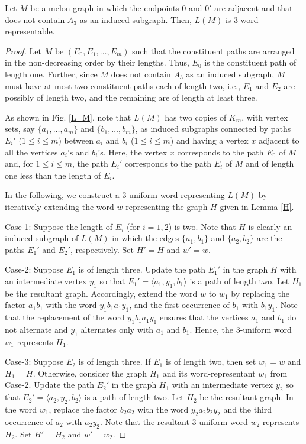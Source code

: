 \documentclass{llncs}
\begin{document}
\begin{lemma}\label{adjacent_line}
	Let $M$ be a melon graph in which the endpoints $0$ and $0'$ are adjacent and that does not contain $A_3$ as an induced subgraph. Then, $L(M)$ is $3$-word-representable.
\end{lemma}
\begin{proof}
	Let $M$ be $(E_0, E_1, \ldots, E_m)$ such that the constituent paths are arranged in the non-decreasing order by their lengths. Thus, $E_0$ is the constituent path of length one. Further, since $M$ does not contain $A_3$ as an induced subgraph, $M$ must have at most two constituent paths each of length two, i.e., $E_1$ and $E_2$ are possibly of length two, and the remaining are of length at least three. 
	
	As shown in Fig. \ref{L_M}, note that $L(M)$ has two copies of $K_m$, with vertex sets, say $\{a_1, \ldots, a_m\}$ and $\{b_1, \ldots, b_m\}$, as induced subgraphs connected by paths  $E_i'$ ($1 \le i \le m$) between $a_i$ and $b_i$ ($1 \le i \le m$) and having a vertex  $x$ adjacent to all the vertices $a_i$'s and $b_i$'s. Here, the vertex $x$ corresponds to the path $E_0$ of $M$ and, for $1 \le i \le m$, the path $E_i'$ corresponds to the path $E_i$ of $M$ and of length one less than the length of $E_i$.         
	
	In the following, we construct a 3-uniform word representing $L(M)$ by iteratively extending the word $w$ representing the graph $H$ given in Lemma \ref{H}. 
	
	Case-1: Suppose the length of $E_i$ (for $i = 1, 2$) is two. Note that $H$ is clearly an induced subgraph of $L(M)$ in which the edges $\{a_1, b_1\}$ and $\{a_2, b_2\}$ are the paths $E_1'$ and $E_2'$, respectively. Set $H' = H$ and $w' = w$.
	
	Case-2: Suppose $E_1$ is of length three. Update the path $E_1'$ in the graph $H$ with an intermediate vertex $y_1$ so that $E_1' = \langle a_1, y_1, b_1\rangle$ is a path of length two. Let $H_1$ be the resultant graph. Accordingly, extend the word $w$ to $w_1$ by replacing the factor $a_1b_1$ with the word $y_1 b_1 a_1 y_1$, and the first occurrence of $b_1$ with $b_1y_1$. Note that the replacement of the word $y_1 b_1 a_1 y_1$ ensures that the vertices $a_1$ and $b_1$ do not alternate and $y_1$ alternates only with $a_1$ and $b_1$. Hence, the 3-uniform word $w_1$ represents $H_1$. 
	
	Case-3: Suppose $E_2$ is of length three. If $E_1$ is of length two, then set $w_1 = w$ and $H_1 = H$. Otherwise, consider the graph $H_1$ and its word-representant $w_1$ from Case-2.  Update the path $E_2'$ in the graph $H_1$ with an intermediate vertex $y_2$ so that $E_2' = \langle a_2, y_2, b_2\rangle$ is a path of length two. Let $H_2$ be the resultant graph. In the word $w_1$, replace the factor $b_2a_2$ with the word $y_2 a_2b_2y_2$ and the third occurrence of $a_2$ with $a_2y_2$. Note that the resultant 3-uniform word $w_2$ represents $H_2$. Set $H' = H_2$ and $w' = w_2$.
	

\end{proof}
\end{document}
